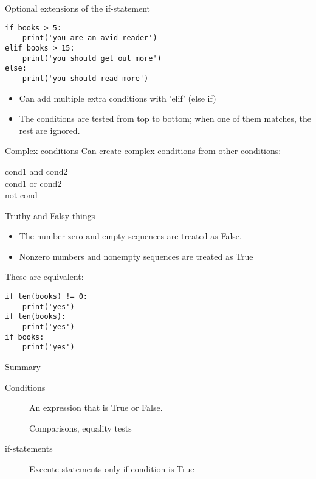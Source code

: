 \documentclass[aspectratio=169,usenames,dvipsnames]{beamer}
\begin{document}
\begin{frame}[fragile]{Optional extensions of the if-statement}
\begin{lstlisting}
if books > 5:
    print('you are an avid reader')
elif books > 15:
    print('you should get out more')
else:
    print('you should read more')
\end{lstlisting}

\begin{itemize}
    \item Can add multiple extra conditions with 'elif' (else if)
    \item The conditions are tested from top to bottom;
            when one of them matches, the rest are ignored.
\end{itemize}
\end{frame}


\begin{frame}{Complex conditions}
    Can create complex conditions from other conditions:
    
    \begin{description}
        \item[cond1 and cond2]
        \item[cond1 or cond2]
        \item[not cond]
    \end{description}

\end{frame}

\begin{frame}[fragile]{Truthy and Falsy things}
\begin{itemize}
\item The number zero and empty sequences are treated as False.
\item Nonzero numbers and nonempty sequences are treated as True
\end{itemize}

These are equivalent:
\begin{lstlisting}
if len(books) != 0:
    print('yes')    
if len(books):
    print('yes')    
if books:
    print('yes')    
\end{lstlisting}

\end{frame}


\begin{frame}{Summary}
    \begin{description}
        \item[Conditions] An expression that is True or False.

                Comparisons, equality tests
        \item[if-statements] Execute statements only if condition is True
    \end{description}
\end{frame}
\end{document}
